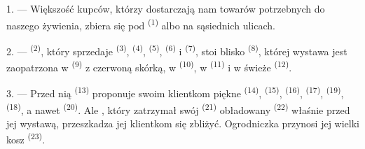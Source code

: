 %
%
%

\VUsaut{4.0mm}
\VUsaut{3.0mm}

\VUsaut{3.0mm}

1. --- Większość kupców, którzy dostarczają nam towarów potrzebnych do naszego żywienia,
zbiera się pod  \textsuperscript{(1)}  albo na
sąsiednich ulicach.

2. ---  \textsuperscript{(2)}, który sprzedaje 
\textsuperscript{(3)},  \textsuperscript{(4)}, 
\textsuperscript{(5)},  \textsuperscript{(6)} i 
\textsuperscript{(7)}, stoi blisko 
\textsuperscript{(8)}, której wystawa jest zaopatrzona w 
\textsuperscript{(9)} z czerwoną skórką, w 
\textsuperscript{(10)}, w  \textsuperscript{(11)} i w świeże
 \textsuperscript{(12)}.

3. --- Przed nią  \textsuperscript{(13)} proponuje swoim
klientkom piękne  \textsuperscript{(14)}, 
\textsuperscript{(15)},  \textsuperscript{(16)},  \textsuperscript{(17)},  \textsuperscript{(19)},
 \textsuperscript{(18)}, a nawet  \textsuperscript{(20)}.
Ale , który zatrzymał swój 
\textsuperscript{(21)} obładowany  \textsuperscript{(22)} właśnie
przed jej wystawą, przeszkadza jej klientkom się zbliżyć. Ogrodniczka przynosi jej
wielki kosz  \textsuperscript{(23)}.

